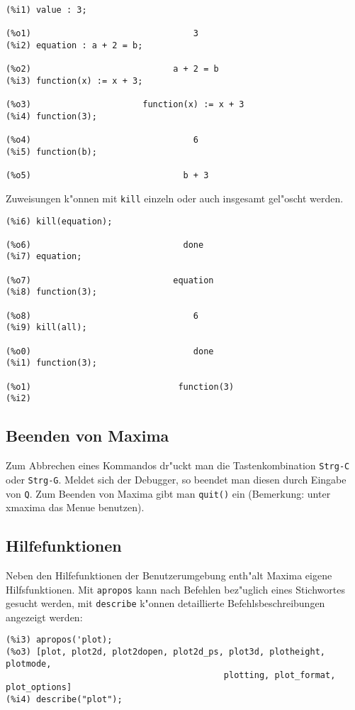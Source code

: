 \documentclass[ngerman,12pt,a4paper]{article}
\begin{document}
\scriptsize
\begin{verbatim}
(%i1) value : 3;

(%o1)                                3
(%i2) equation : a + 2 = b;

(%o2)                            a + 2 = b
(%i3) function(x) := x + 3;

(%o3)                      function(x) := x + 3
(%i4) function(3);

(%o4)                                6
(%i5) function(b);

(%o5)                              b + 3
\end{verbatim}
\normalsize
Zuweisungen k"onnen mit \verb|kill| einzeln oder auch insgesamt gel"oscht werden.
\scriptsize
\begin{verbatim}
(%i6) kill(equation);

(%o6)                              done
(%i7) equation;

(%o7)                            equation
(%i8) function(3);

(%o8)                                6
(%i9) kill(all);

(%o0)                                done
(%i1) function(3);

(%o1)                             function(3)
(%i2)
\end{verbatim}
\normalsize

\subsection{Beenden von Maxima}


Zum Abbrechen eines Kommandos dr"uckt man die Tastenkombination \verb|Strg-C| oder \verb|Strg-G|. Meldet sich der Debugger, so beendet man diesen durch Eingabe von \verb|Q|.
Zum Beenden von Maxima gibt man \verb|quit()| ein (Bemerkung: unter xmaxima das Menue benutzen).


\subsection{Hilfefunktionen}

Neben den Hilfefunktionen der Benutzerumgebung enth"alt Maxima eigene Hilfsfunktionen. Mit \verb|apropos| kann nach Befehlen bez"uglich eines Stichwortes gesucht werden, mit \verb|describe| k"onnen detaillierte Befehlsbeschreibungen angezeigt werden:

\scriptsize
\begin{verbatim}
(%i3) apropos('plot);
(%o3) [plot, plot2d, plot2dopen, plot2d_ps, plot3d, plotheight, plotmode,
                                           plotting, plot_format, plot_options]
(%i4) describe("plot");
\end{verbatim}
\normalsize
\end{document}
